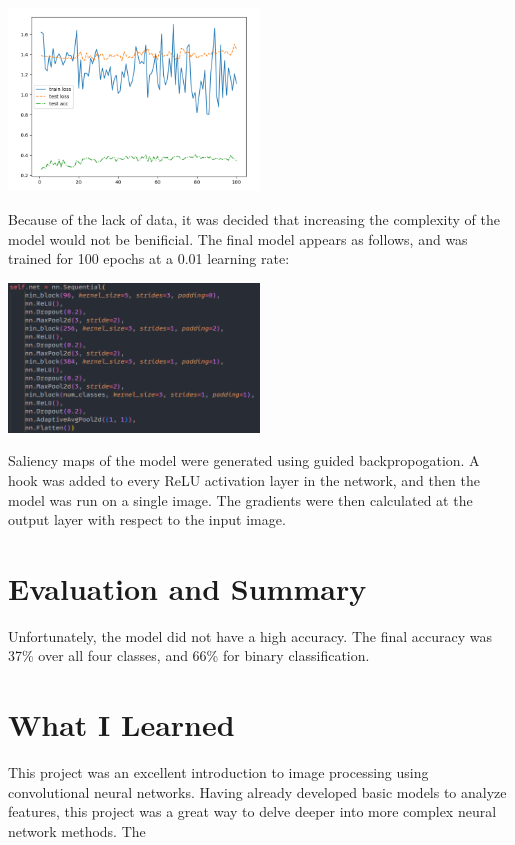 \documentclass{article}[12pt]
\begin{document}
\begin{center}
    \includegraphics[width=0.5\textwidth]{images/model_augmented_dropout.png}
\end{center}
\indent
Because of the lack of data, it was decided that increasing the complexity of the model would not be benificial. The final model appears as follows, and was trained for 100 epochs at a 0.01 learning rate:

\begin{center}
    \includegraphics[width=0.5\textwidth]{images/model_code.png}
\end{center}

\indent
Saliency maps of the model were generated using guided backpropogation. A hook was added to every ReLU activation layer in the network, and then the model was run on a single image. The gradients were then calculated at the output layer with respect to the input image.

\section*{Evaluation and Summary}



Unfortunately, the model did not have a high accuracy. The final accuracy was 37\% over all four classes, and 66\% for binary classification.

\indent


\section*{What I Learned}

This project was an excellent introduction to image processing using convolutional neural networks. Having already developed basic models to analyze features, this project was a great way to delve deeper into more complex neural network methods. The 




\end{document}
